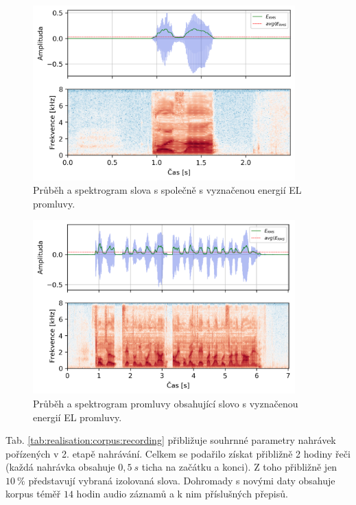 \begin{figure}[hbpt]
  \centering
  \includegraphics[width=0.9\textwidth]{./ch5-construction/img/energy_spec_word.png}
  \caption{Průběh a spektrogram slova  s společně s vyznačenou energií EL promluvy.}
  \label{fig:realisation:corpus:word}
\end{figure}

\begin{figure}[hbpt]
  \centering
  \includegraphics[width=0.9\textwidth]{./ch5-construction/img/energy_spec_sentence.png}
  \caption{Průběh a spektrogram promluvy obsahující slovo  s vyznačenou energií EL promluvy.}
  \label{fig:realisation:corpus:sentence}
\end{figure}

Tab. \ref{tab:realisation:corpus:recording} přibližuje souhrnné parametry nahrávek pořízených v 2. etapě nahrávání. Celkem se podařilo získat přibližně 2 hodiny řeči (každá nahrávka obsahuje $0,5\ s$ ticha na začátku a konci). Z toho přibližně jen $10\ \%$ představují vybraná izolovaná slova. Dohromady s novými daty obsahuje korpus téměř $14$ hodin audio záznamů a k nim příslušných přepisů.

